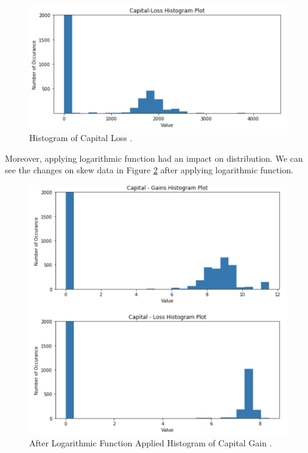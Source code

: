 \documentclass[sigconf]{acmart}
\begin{document}
 \begin{figure}[!ht]
  \centering
      \includegraphics[width=\columnwidth]{images/capital-loss.png}
  \caption{Histogram of Capital Loss \cite{Borga2017}.}\label{fig:loss-capital}
\end{figure}

\par Moreover, applying logarithmic function had an impact on distribution. We can see the changes on skew data in Figure \ref{fig:Hist-capital-log} after applying logarithmic function. 

 \begin{figure}[!ht]
  \centering
      \includegraphics[width=\columnwidth]{images/logarithmic-applied.png}
  \caption{After Logarithmic Function Applied Histogram of Capital Gain \cite{Borga2017}.}\label{fig:Hist-capital-log}
\end{figure}
\end{document}
